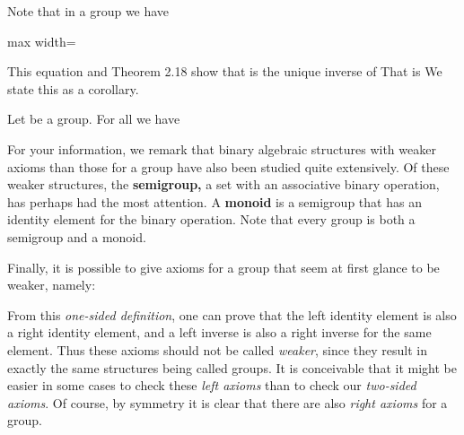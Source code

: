 \documentclass[11pt,oneside]{article}
\begin{document}
\begin{BookBody}

Note that in a group  we have

\begin{center}\begin{adjustbox}{max width=\linewidth}\end{adjustbox}\end{center}

This equation and Theorem 2.18 show that  is the unique inverse of  That is We state this as a corollary.

 Let  be a group. For all  we have  \BookEnd{\blacklozenge}

For your information, we remark that binary algebraic structures with weaker axioms than those for a group have also been studied quite extensively. Of these weaker structures, the\textbf{ semigroup,} a set with an associative binary operation, has perhaps had the most attention. A\textbf{ monoid} is a semigroup that has an identity element for the binary operation. Note that every group is both a semigroup and a monoid.

Finally, it is possible to give axioms for a group  that seem at first glance to be weaker, namely:




\noindent From this\textit{ one-sided definition}, one can prove that the left identity element is also a right identity element, and a left inverse is also a right inverse for the same element. Thus these axioms should not be called\textit{ weaker}, since they result in exactly the same structures being called groups. It is conceivable that it might be easier in some cases to check these\textit{ left axioms} than to check our\textit{ two-sided axioms}. Of course, by symmetry it is clear that there are also\textit{ right axioms} for a group.


\end{BookBody}
\end{document}
